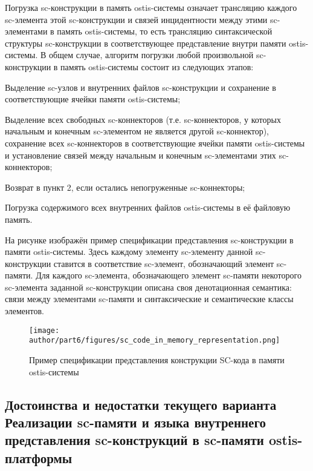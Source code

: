 Погрузка sc-конструкции в память ostis-системы означает трансляцию каждого sc-элемента этой sc-конструкции и связей инцидентности между этими sc-элементами в память ostis-системы, то есть трансляцию синтаксической структуры sc-конструкции в соответствующее представление внутри памяти ostis-системы. В общем случае, алгоритм погрузки любой произвольной sc-конструкции в память ostis-системы состоит из следующих этапов:
\begin{textitemize}
    \item Выделение sc-узлов и внутренних файлов sc-конструкции и сохранение в соответствующие ячейки памяти ostis-системы;
    \item Выделение всех свободных sc-коннекторов (т.е. sc-коннекторов, у которых начальным и конечным sc-элементом не является другой sc-коннектор), сохранение всех sc-коннекторов в соответствующие ячейки памяти ostis-системы и установление связей между начальным и конечным sc-элементами этих sc-коннекторов;
    \item Возврат в пункт 2, если остались непогруженные sc-коннекторы;
    \item Погрузка содержимого всех внутренних файлов ostis-системы в её файловую память.
\end{textitemize}

На рисунке  изображён пример спецификации представления sc-конструкции в памяти ostis-системы. Здесь каждому элементу sc-элементу данной sc-конструкции ставится в соответствие sc-элемент, обозначающий элемент sc-памяти. Для каждого sc-элемента, обозначающего элемент sc-памяти некоторого sc-элемента заданной sc-конструкции описана своя денотационная семантика: связи между элементами sc-памяти и синтаксические и семантические классы элементов.

\begin{figure*}[htbp]
  \center
  \texttt{[image: author/part6/figures/sc\_code\_in\_memory\_representation.png]}
  \caption{Пример спецификации представления конструкции SC-кода в памяти ostis-системы}
  \label{fig:sc_code_in_memory_representation}
\end{figure*}

\subsection{Достоинства и недостатки текущего варианта Реализации sc-памяти и языка внутреннего представления sc-конструкций в sc-памяти ostis-платформы}
\label{sec_soft_platform_scin_code_problems}

